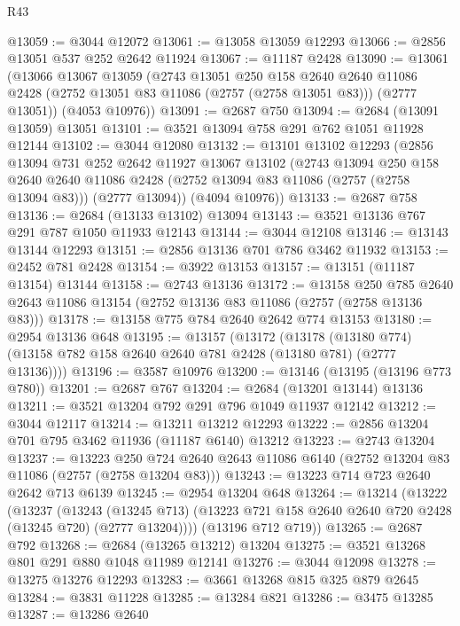 \begin{lexlean}{R43}
\begin{coremodule}
@13059 := @3044 @12072
@13061 := @13058 @13059 @12293
@13066 := @2856 @13051 @537 @252 @2642 @11924
@13067 := @11187 @2428
@13090 := @13061
    (@13066
      @13067
      @13059
      (@2743
        @13051
        @250
        @158
        @2640
        @2640
        @11086
        @2428
        (@2752 @13051 @83 @11086 (@2757 (@2758 @13051 @83)))
        (@2777 @13051))
      (@4053 @10976))
@13091 := @2687 @750
@13094 := @2684 (@13091 @13059) @13051
@13101 := @3521 @13094 @758 @291 @762 @1051 @11928 @12144
@13102 := @3044 @12080
@13132 := @13101
    @13102
    @12293
    (@2856
      @13094
      @731
      @252
      @2642
      @11927
      @13067
      @13102
      (@2743
        @13094
        @250
        @158
        @2640
        @2640
        @11086
        @2428
        (@2752 @13094 @83 @11086 (@2757 (@2758 @13094 @83)))
        (@2777 @13094))
      (@4094 @10976))
@13133 := @2687 @758
@13136 := @2684 (@13133 @13102) @13094
@13143 := @3521 @13136 @767 @291 @787 @1050 @11933 @12143
@13144 := @3044 @12108
@13146 := @13143 @13144 @12293
@13151 := @2856 @13136 @701 @786 @3462 @11932
@13153 := @2452 @781 @2428
@13154 := @3922 @13153
@13157 := @13151 (@11187 @13154) @13144
@13158 := @2743 @13136
@13172 := @13158
    @250
    @785
    @2640
    @2643
    @11086
    @13154
    (@2752 @13136 @83 @11086 (@2757 (@2758 @13136 @83)))
@13178 := @13158 @775 @784 @2640 @2642 @774 @13153
@13180 := @2954 @13136 @648
@13195 := @13157
    (@13172
      (@13178 (@13180 @774) (@13158 @782 @158 @2640 @2640 @781 @2428 (@13180 @781) (@2777 @13136))))
@13196 := @3587 @10976
@13200 := @13146 (@13195 (@13196 @773 @780))
@13201 := @2687 @767
@13204 := @2684 (@13201 @13144) @13136
@13211 := @3521 @13204 @792 @291 @796 @1049 @11937 @12142
@13212 := @3044 @12117
@13214 := @13211 @13212 @12293
@13222 := @2856 @13204 @701 @795 @3462 @11936 (@11187 @6140) @13212
@13223 := @2743 @13204
@13237 := @13223
    @250
    @724
    @2640
    @2643
    @11086
    @6140
    (@2752 @13204 @83 @11086 (@2757 (@2758 @13204 @83)))
@13243 := @13223 @714 @723 @2640 @2642 @713 @6139
@13245 := @2954 @13204 @648
@13264 := @13214
    (@13222
      (@13237
        (@13243
          (@13245 @713)
          (@13223 @721 @158 @2640 @2640 @720 @2428 (@13245 @720) (@2777 @13204))))
      (@13196 @712 @719))
@13265 := @2687 @792
@13268 := @2684 (@13265 @13212) @13204
@13275 := @3521 @13268 @801 @291 @880 @1048 @11989 @12141
@13276 := @3044 @12098
@13278 := @13275 @13276 @12293
@13283 := @3661 @13268 @815 @325 @879 @2645
@13284 := @3831 @11228
@13285 := @13284 @821
@13286 := @3475 @13285
@13287 := @13286 @2640

\end{coremodule}
\end{lexlean}
